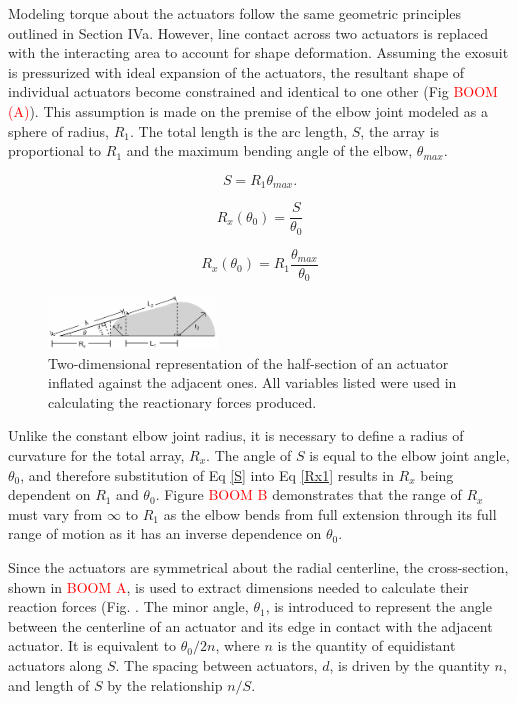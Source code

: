 \documentclass[letterpaper, 10 pt, conference]{ieeeconf}  %
\begin{document}
Modeling torque about the actuators follow the same geometric principles outlined in Section IVa. However, line contact across two actuators is replaced with the interacting area to account for shape deformation. Assuming the exosuit is pressurized with ideal expansion of the actuators, the resultant shape of individual actuators become constrained and identical to one other (Fig \textcolor{red}{BOOM (A)}). This assumption is made on the premise of the elbow joint modeled as a sphere of radius, $R_1$.  The total length is the arc length, $S$, the array is proportional to $R_1$ and the maximum bending angle of the elbow, $\theta_{max}$.

\begin{equation}\label{S}
	S = R_1\theta_{max}.
\end{equation}

\begin{equation}\label{Rx1}
	R_x(\theta_0) = \frac{S}{\theta_0}
\end{equation}

\begin{equation}\label{Rx2}
	R_x(\theta_0) = R_1\frac{\theta_{max}}{\theta_0}
\end{equation}

\begin{figure}[b!]
\centering
\includegraphics[width=0.4\textwidth]{Models_Torque.PNG}
\caption{Two-dimensional representation of the half-section of an actuator inflated against the adjacent ones. All variables listed were used in calculating the reactionary forces produced. }
\label{fig:nomenclature}
\end{figure}

Unlike the constant elbow joint radius, it is necessary to define a radius of curvature for the total array, $R_x$. The angle of $S$ is equal to the elbow joint angle, $\theta_0$, and therefore substitution of Eq \ref{S} into Eq \ref{Rx1} results in $R_x$ being dependent on $R_1$ and $\theta_0$.  Figure \textcolor{red}{BOOM B} demonstrates that the range of $R_x$ must vary from ${\infty}$ to $R_{1}$ as the elbow bends from full extension through its full range of motion as it has an inverse dependence on $\theta_0$.    

Since the actuators are symmetrical about the radial centerline, the cross-section, shown in \textcolor{red}{BOOM A}, is used to extract dimensions needed to calculate their reaction forces (Fig. .  The minor angle, $\theta_1$, is introduced to represent the angle between the centerline of an actuator and its edge in contact with the adjacent actuator. It is equivalent to $\theta_0/2n$, where $n$ is the quantity of equidistant actuators along $S$.  The spacing between actuators, $d$, is driven by the quantity $n$, and length of $S$ by the relationship $n/S$. 
\end{document}
